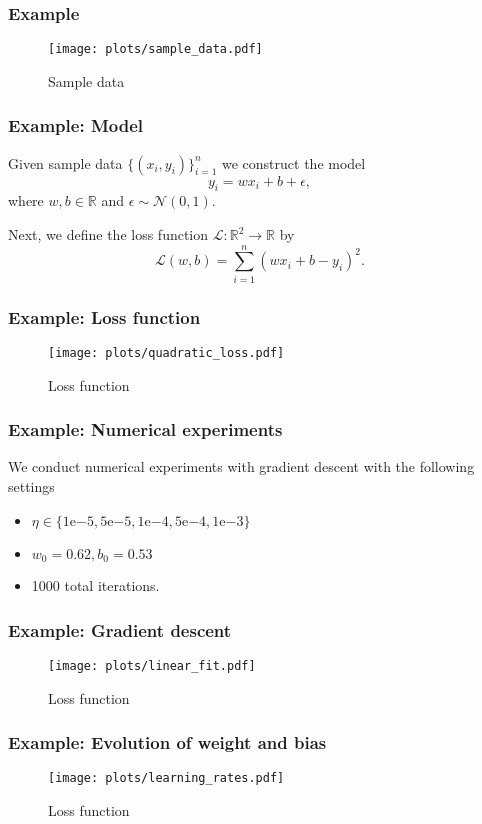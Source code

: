 \documentclass[17pt,institute=e10]{tuhh_presentation}
\newcommand{\R}{\mathbb{R}}
\newcommand{\CL}{\mathcal{L}}
\newcommand{\expnumber}[2]{{#1}\mathrm{e}{#2}}
\begin{document}
\begin{frame}[fragile]
  \frametitle{Example}
  
    \vspace{-1cm}
    \begin{figure}
      \centering
      \texttt{[image: plots/sample\_data.pdf]}
      \caption{Sample data}
    \end{figure}
\end{frame}
\begin{frame}[fragile]
  \frametitle{Example: Model}
  Given sample data $\{(x_i,y_i)\}_{i=1}^n$ we construct the model
  \begin{equation*}
    y_i = w x_i + b + \epsilon,
  \end{equation*}
  where $w, b \in \R$ and $\epsilon \sim \mathcal{N}(0,1)$.

  Next, we define the loss function $\CL : \R^2 \rightarrow \R$ by
  \begin{equation*}
    \CL(w,b) = \sum_{i = 1}^{n} \left(w x_i + b - y_i\right)^2.
  \end{equation*}
\end{frame}
\begin{frame}[fragile]
  \frametitle{Example: Loss function}
    \vspace{-1cm}
    \begin{figure}
      \centering
      \texttt{[image: plots/quadratic\_loss.pdf]}
      \caption{Loss function}
    \end{figure}
\end{frame}
\begin{frame}[fragile]
  \frametitle{Example: Numerical experiments}
  We conduct numerical experiments with gradient descent with the following settings
  \begin{itemize}
    \item $\eta \in \{\expnumber{1}{-5},\expnumber{5}{-5}, \expnumber{1}{-4}, \expnumber{5}{-4}, \expnumber{1}{-3}\}$
    \item $w_0 = 0.62, b_0 = 0.53$
    \item 1000 total iterations.
  \end{itemize}
\end{frame}
\begin{frame}[fragile]
  \frametitle{Example: Gradient descent}
    \vspace{-1cm}
    \begin{figure}
      \centering
      \texttt{[image: plots/linear\_fit.pdf]}
      \caption{Loss function}
    \end{figure}
\end{frame}
\begin{frame}[fragile]
  \frametitle{Example: Evolution of weight and bias}
    \vspace{-1cm}
    \begin{figure}
      \centering
      \texttt{[image: plots/learning\_rates.pdf]}
      \caption{Loss function}
    \end{figure}
\end{frame}
\end{document}
